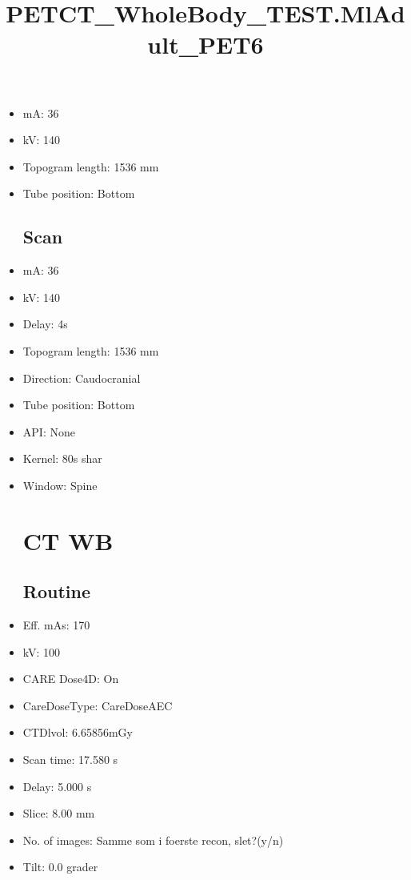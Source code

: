 \documentclass[12pt]{article}
\title{PETCT\_WholeBody\_TEST.MlAdult\_PET6}
\begin{document}
\maketitle
\newpage
\tableofcontents
\newpage
{}


\begin{itemize}\section{Topogram}
\subsection{Routine}
\item mA: 36\item kV: 140\item Topogram length: 1536 mm\item Tube position: Bottom
\subsection{Scan}\item mA: 36\item kV: 140\item Delay: 4s\item Topogram length: 1536 mm\item Direction: Caudocranial\item Tube position: Bottom\item API: None\item Kernel: 80s shar\item Window: Spine
\section{CT WB}
\subsection{Routine}
\item Eff. mAs: 170\item kV: 100\item CARE Dose4D: On\item CareDoseType: CareDoseAEC\item CTDlvol: 6.65856mGy\item Scan time: 17.580 s\item Delay: 5.000 s\item Slice: 8.00 mm\item No. of images: Samme som i foerste recon, slet?(y/n)\item Tilt: 0.0 grader

\end{itemize}
\end{document}
